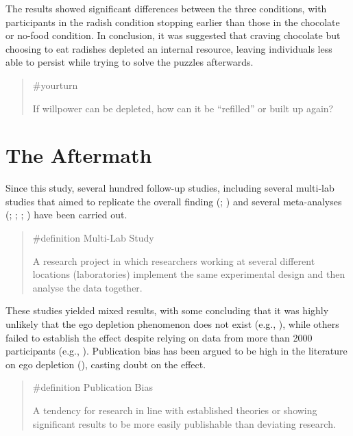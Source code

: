 \documentclass[
  letterpaper,
]{book}
\begin{document}
The results showed significant differences between the three conditions,
with participants in the radish condition stopping earlier than those in
the chocolate or no-food condition. In conclusion, it was suggested that
craving chocolate but choosing to eat radishes depleted an internal
resource, leaving individuals less able to persist while trying to solve
the puzzles afterwards.

\begin{quote}
{\#yourturn}

If willpower can be depleted, how can it be ``refilled'' or built up
again?
\end{quote}

\section{The Aftermath}\label{the-aftermath}

Since this study, several hundred follow-up studies, including several
multi-lab studies that aimed to replicate the overall finding
(;
) and several meta-analyses
(;
;
;
) have
been carried out.

\begin{quote}
\label{def-multilabstudy}{\#definition} Multi-Lab Study

A research project in which researchers working at several different
locations (laboratories) implement the same experimental design and then
analyse the data together.
\end{quote}

These studies yielded mixed results, with some concluding that it was
highly unlikely that the ego depletion phenomenon does not exist (e.g.,
), while others failed to
establish the effect despite relying on data from more than 2000
participants (e.g., ).
Publication bias has been argued to be high in the literature on ego
depletion (), casting doubt on the effect.

\begin{quote}
{\#definition} Publication Bias

A tendency for research in line with established theories or showing
significant results to be more easily publishable than deviating
research.
\end{quote}
\end{document}
